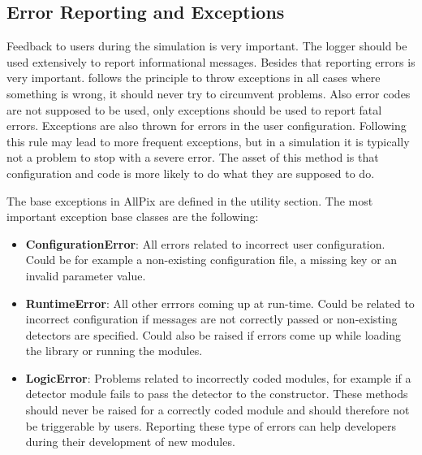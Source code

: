 \subsection{Error Reporting and Exceptions}
\label{sec:error_reporting_exceptions}
Feedback to users during the simulation is very important. The logger should be used extensively to report informational messages. Besides that reporting errors is very important. \apsq follows the principle to throw exceptions in all cases where something is wrong, it should never try to circumvent problems. Also error codes are not supposed to be used, only exceptions should be used to report fatal errors. Exceptions are also thrown for errors in the user configuration. Following this rule may lead to more frequent exceptions, but in a simulation it is typically not a problem to stop with a severe error. The asset of this method is that configuration and code is more likely to do what they are supposed to do.

The base exceptions in AllPix are defined in the utility section. The most important exception base classes are the following:
\begin{itemize}
\item \textbf{ConfigurationError}: All errors related to incorrect user configuration. Could be for example a non-existing configuration file, a missing key or an invalid parameter value.
\item \textbf{RuntimeError}: All other errrors coming up at run-time. Could be related to incorrect configuration if messages are not correctly passed or non-existing detectors are specified. Could also be raised if errors come up while loading the library or running the modules.
\item \textbf{LogicError}: Problems related to incorrectly coded modules, for example if a detector module fails to pass the detector to the constructor. These methods should never be raised for a correctly coded module and should therefore not be triggerable by users. Reporting these type of errors can help developers during their development of new modules.
\end{itemize}

